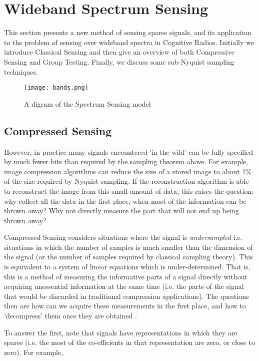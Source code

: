 \section{Wideband Spectrum Sensing}
This section presents a new method of sensing sparse signals, and its application to the problem of sensing over wideband spectra in Cognitive Radios. Initially we introduce Classical Sensing and then give an overview of both Compressive Sensing and Group Testing. Finally, we discuss some sub-Nyquist sampling techniques.

\begin{figure*}[h]
\centering
\texttt{[image: bands.png]}
\caption{A digram of the Spectrum Sensing model \cite{Tian}}
\label{widebandspectra}
\end{figure*}



\subsection{Compressed Sensing}

However, in practice many signals encountered 'in the wild' can be fully specified by much fewer bits than required by the sampling theorem above. For example, image compression algorithms can reduce the size of a stored image to about 1\% of the size required by Nyquist sampling. If the reconstruction algorithm is able to reconstruct the image from this small amount of data, this raises the question: why collect all the data in the first place, when most of the information can be thrown away? Why not directly measure the part that will not end up being thrown away?

Compressed Sensing considers situations where the signal is \textit{undersampled} i.e. situations in which the number of samples is much smaller than the dimension of the signal (or the number of samples required by classical sampling theory). This is equivalent to a system of linear equations which is under-determined.  That is, this is a method of measuring the informative parts of a signal directly without acquiring unessential information at the same time (i.e. the parts of the signal that would be discarded in traditional compression applications). The questions then are how can we acquire these measurements in the first place, and how to 'decompress' them once they are obtained \cite{Donoho2006}. 

To answer the first, note that signals have representations in which they are sparse (i.e. the most of the co-efficients in that representation are zero, or close to zero). For example, 

